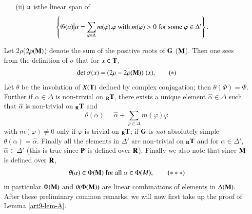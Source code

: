 \begin{notation*}
\begin{itemize}
\item[(ii)] $\mathfrak{u}$ is\pageoriginale the linear span of
$$
\left\{\mathfrak{G} (a) \big| \alpha = \sum\limits_{\varphi \in \Delta} m(\varphi) . \varphi \text{ with } m (\varphi ) >0 \text{ for some } \varphi \in \Delta'  \right\}.
$$
\end{itemize}
Let $2 \rho $(\resp $2\rho(\mathbf{M})$) denote the sum of the positive roots of $\mathbf{G}$ (\resp $\mathbf{M}$). Then one sees from the definition of $\sigma$ that for $x \in \mathbf{T}$, 
\begin{equation}
\det \sigma (x) = (2 \rho - 2 \rho (\mathbf{M})) \;(x).  \tag*{$(\ast)$}\label{art9-eqapp-*}
\end{equation} 
Let $\theta$ be the involution of $X (\mathbf{T})$ defined by complex conjugation; then $\theta(\Phi) = \Phi$. Further if $\alpha \in \Delta$ is non-trivial on ${}_{\mathbf{R}} \mathbf{T}$, there exists a unique element $\hat{\alpha} \in \Delta$ such that $\hat{\alpha}$ is non-trivial on ${}_{\mathbf{R}} \mathbf{T}$ and 
\begin{equation}
\theta (\alpha) = \hat{\alpha} + \sum\limits_{\varphi \in \Delta} m (\varphi) \varphi \tag*{$(\ast\ast)$}\label{art9-eqapp-**}
\end{equation}
with $m(\varphi) \neq 0$ only if $\varphi$ is trivial on ${}_{\mathbf{R}} \mathbf{T}$; if $\mathbf{G}$ is \textit{not} absolutely simple $\theta(\alpha) = \hat{\alpha}$. Finally all the elements in $\Delta'$ are non-trivial on ${}_{\mathbf{R}} \mathbf{T}$ and for $\alpha \in \Delta'$, $\hat{\alpha} \in\Delta'$ (this is true since $\mathbf{P}$ is defined over $\mathbf{R}$). Finally we also note that since $\mathbf{M}$ is defined over $\mathbf{R}$,
\begin{equation}
\theta (\alpha) \in \Phi (\mathbf{M}) \text{ for all } \alpha \in \Phi (M) ; \tag*{$(\ast\ast\ast)$}\label{art9-eqapp-***}
\end{equation}
in particular $\Phi(\mathbf{M})$ and $\theta (\Phi (\mathbf{M}))$ are linear combinations of elements in $\Delta (\mathbf{M})$. After these preliminary common remarks, we will now first take up the proof of Lemma \ref{art9-lem-A}.
\end{notation*}

